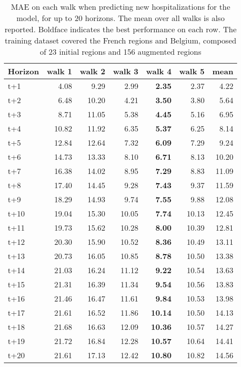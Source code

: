 \begin{table}[H]
\centering
\caption{MAE on each walk when predicting new hospitalizations for the model, for up to 20 horizons. The mean over all walks is also reported. Boldface indicates the best performance on each row. The training dataset covered the French regions and Belgium, composed of 23 initial regions and 156 augmented regions }
\label{tab:MAE_walk_baseline}
\begin{tabular}{lrrrrrr}
\toprule
Horizon &  walk 1 &  walk 2 &  walk 3 &  walk 4 &  walk 5 &  mean \\
\midrule
t+1  & 4.08  & 9.29  & 2.99  & \textbf{2.35}  & 2.37  & 4.22  \\
t+2  & 6.48  & 10.20  & 4.21  & \textbf{3.50}  & 3.80  & 5.64  \\
t+3  & 8.71  & 11.05  & 5.38  & \textbf{4.45}  & 5.16  & 6.95  \\
t+4  & 10.82  & 11.92  & 6.35  & \textbf{5.37}  & 6.25  & 8.14  \\
t+5  & 12.84  & 12.64  & 7.32  & \textbf{6.09}  & 7.29  & 9.24  \\
t+6  & 14.73  & 13.33  & 8.10  & \textbf{6.71}  & 8.13  & 10.20  \\
t+7  & 16.38  & 14.02  & 8.95  & \textbf{7.29}  & 8.83  & 11.09  \\
t+8  & 17.40  & 14.45  & 9.28  & \textbf{7.43}  & 9.37  & 11.59  \\
t+9  & 18.29  & 14.93  & 9.74  & \textbf{7.55}  & 9.88  & 12.08  \\
t+10  & 19.04  & 15.30  & 10.05  & \textbf{7.74}  & 10.13  & 12.45  \\
t+11  & 19.73  & 15.62  & 10.28  & \textbf{8.00}  & 10.39  & 12.81  \\
t+12  & 20.30  & 15.90  & 10.52  & \textbf{8.36}  & 10.49  & 13.11  \\
t+13  & 20.73  & 16.05  & 10.85  & \textbf{8.78}  & 10.50  & 13.38  \\
t+14  & 21.03  & 16.24  & 11.12  & \textbf{9.22}  & 10.54  & 13.63  \\
t+15  & 21.31  & 16.39  & 11.34  & \textbf{9.54}  & 10.56  & 13.83  \\
t+16  & 21.46  & 16.47  & 11.61  & \textbf{9.84}  & 10.53  & 13.98  \\
t+17  & 21.61  & 16.52  & 11.86  & \textbf{10.14}  & 10.50  & 14.13  \\
t+18  & 21.68  & 16.63  & 12.09  & \textbf{10.36}  & 10.57  & 14.27  \\
t+19  & 21.72  & 16.84  & 12.28  & \textbf{10.57}  & 10.64  & 14.41  \\
t+20  & 21.61  & 17.13  & 12.42  & \textbf{10.80}  & 10.82  & 14.56  \\

\bottomrule
\end{tabular}
\end{table}
